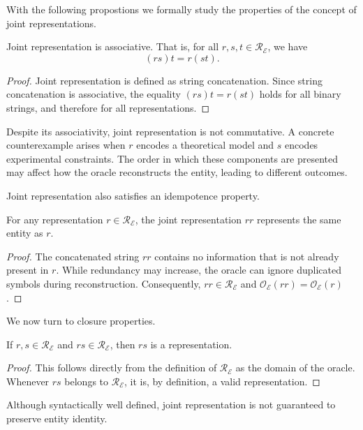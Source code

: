 With the following propostions we formally study the properties of the concept of joint representations.

\begin{proposition}
Joint representation is associative. That is, for all $r,s,t \in \mathcal{R}_{\mathcal{E}}$, we have
\[
(rs)t = r(st).
\]
\end{proposition}
\begin{proof}
Joint representation is defined as string concatenation. Since string concatenation is associative, the equality $(rs)t = r(st)$ holds for all binary strings, and therefore for all representations.
\end{proof}

Despite its associativity, joint representation is not commutative. A concrete counterexample arises when $r$ encodes a theoretical model and $s$ encodes experimental constraints. The order in which these components are presented may affect how the oracle reconstructs the entity, leading to different outcomes.

Joint representation also satisfies an idempotence property.

\begin{proposition}
For any representation $r \in \mathcal{R}_{\mathcal{E}}$, the joint representation $rr$ represents the same entity as $r$.
\end{proposition}
\begin{proof}
The concatenated string $rr$ contains no information that is not already present in $r$. While redundancy may increase, the oracle can ignore duplicated symbols during reconstruction. Consequently, $rr \in \mathcal{R}_{\mathcal{E}}$ and $\mathcal{O}_{\mathcal{E}}(rr) = \mathcal{O}_{\mathcal{E}}(r)$.
\end{proof}

We now turn to closure properties.

\begin{proposition}
If $r,s \in \mathcal{R}_{\mathcal{E}}$ and $rs \in \mathcal{R}_{\mathcal{E}}$, then $rs$ is a representation.
\end{proposition}
\begin{proof}
This follows directly from the definition of $\mathcal{R}_{\mathcal{E}}$ as the domain of the oracle. Whenever $rs$ belongs to $\mathcal{R}_{\mathcal{E}}$, it is, by definition, a valid representation.
\end{proof}

Although syntactically well defined, joint representation is not guaranteed to preserve entity identity.

